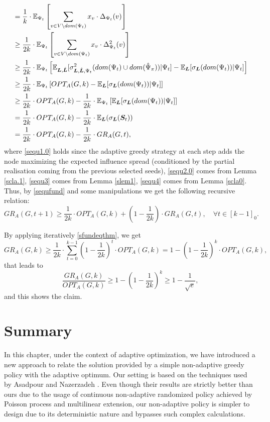 \begin{align}
&= \frac{1}{k}\cdot \mathbb{E}_{\Psi_t}\left[\sum_{v\in V\setminus dom(\Psi_t)}x_v\cdot \Delta_{\Psi_t}(v)\right]\nonumber\\
&\geq \frac{1}{2k}\cdot \mathbb{E}_{\Psi_t}\left[\sum_{v\in V\setminus dom(\Psi_t)}x_v\cdot \Delta^2_{\Psi_t}(v)\right]\label{sequ2.0}\\
&\geq \frac{1}{2k}\cdot \mathbb{E}_{\Psi_t}\left[\mathbb{E}_{\bm L,\hat{\bm L}}[\sigma^{2}_{\bm L,\hat{\bm L},\Psi_t}(dom(\Psi_t)\cup dom(\hat{\Psi}_{\pi}))|\Psi_t]-\mathbb{E}_{\bm L}[\sigma_{\bm L}(dom(\Psi_t))|\Psi_t]\right]\label{sequ3}\\
&\geq \frac{1}{2k}\cdot \mathbb{E}_{\Psi_t}\left[OPT_A(G,k)-\mathbb{E}_{\bm L}[\sigma_{\bm L}(dom(\Psi_t))|\Psi_t]\right]\label{sequ4}\\
&\geq \frac{1}{2k}\cdot OPT_A(G,k)-\frac{1}{2k}\cdot \mathbb{E}_{\Psi_t}\left[\mathbb{E}_{\bm L}[\sigma_{\bm L}(dom(\Psi_t))|\Psi_t]\right]\nonumber\\
&=\frac{1}{2k}\cdot OPT_A(G,k)-\frac{1}{2k}\cdot \mathbb{E}_{\bm L}(\sigma_{\bm L}(\bm S_t))\nonumber\\
&=\frac{1}{2k}\cdot OPT_A(G,k)-\frac{1}{2k}\cdot GR_A(G,t),\label{sequfund}
\end{align}
where \eqref{sequ1.0} holds since the adaptive greedy strategy at each step adds the node maximizing the expected influence spread (conditioned by the partial realisation coming from the previous selected seeds), \eqref{sequ2.0} comes from Lemma \ref{scla.1}, \eqref{sequ3} comes from Lemma \ref{slem1}, \eqref{sequ4} comes from Lemma \ref{scla0}. 
Thus, by \eqref{sequfund} and some manipulations we get the following recursive relation:
\begin{equation}\label{sfundeqthm}
{GR}_A(G,t+1)\geq \frac{1}{2k}\cdot OPT_A(G,k)+\left(1-\frac{1}{2k}\right)\cdot {GR}_A(G,t),\quad \forall t\in [k-1]_0.
\end{equation}

By applying iteratively \eqref{sfundeqthm}, we get
\begin{equation*}
{GR}_A(G,k)\geq \frac{1}{2k}\cdot \sum_{t=0}^{k-1}\left(1-\frac{1}{2k}\right)^{t}\cdot OPT_A(G,k)=1-\left(1-\frac{1}{2k}\right)^{k}\cdot OPT_A(G,k),
\end{equation*}
that leads to 
\begin{equation*}
\frac{{GR}_A(G,k)}{OPT_A(G,k)}\geq 1-\left(1-\frac{1}{2k}\right)^{k} \geq 1-\frac{1}{\sqrt{e}},
\end{equation*}
and this shows the claim.

\section{Summary}\label{sec_future}
In this chapter, under the context of adaptive optimization, we have introduced a new approach to relate the solution provided by a simple non-adaptive greedy policy with the adaptive optimum. Our setting is based on the techniques used by Asadpour and Nazerzadeh \cite{Asadpour16}. Even though their results are strictly better than ours due to the usage of continuous non-adaptive randomized policy achieved by Poisson process and multilinear extension, our non-adaptive policy is simpler to design due to its deterministic nature and bypasses such complex calculations.

